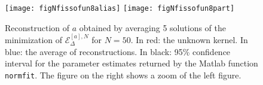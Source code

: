 \begin{figure}[h!]
\begin{center}
\hspace{-1cm}
\texttt{[image: figNfissofun8alias]}\hspace{-0.9cm}
\texttt{[image: figNfissofun8part]}
\end{center}
\caption{Reconstruction of $a$ obtained by averaging 5 solutions of the minimization of $\mathcal{E}^{[a],N}_\Delta$ for $N = 50$. In red: the unknown kernel. In blue: the average of reconstructions. In black: 95\% confidence interval for the parameter estimates returned by the Matlab function \texttt{normfit}. The figure on the right shows a zoom of the left figure.}\label{fixedN}
\end{figure}